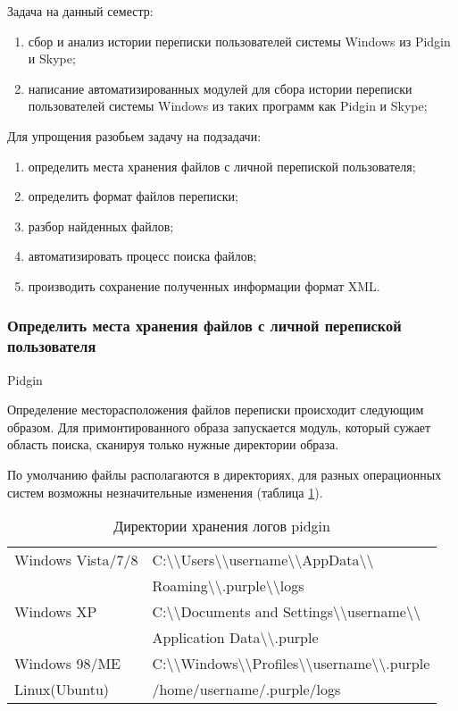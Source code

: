 Задача на данный семестр:  

\begin{enumerate}
\item сбор и анализ истории переписки пользователей системы Windows из Pidgin и Skype;
\item написание автоматизированных модулей для сбора истории переписки пользователей системы Windows из таких программ как Pidgin и Skype;
\end{enumerate}

Для упрощения разобьем задачу на подзадачи:
\begin{enumerate}
\item определить места хранения файлов с личной перепиской пользователя;
\item определить формат файлов переписки;
\item разбор найденных файлов;
\item автоматизировать процесс поиска файлов;
\item производить сохранение полученных информации формат XML.
\end{enumerate}

\subsubsection{Определить места хранения файлов с личной перепиской пользователя}

Pidgin

Определение месторасположения файлов переписки происходит следующим образом. Для примонтированного образа запускается модуль, который сужает область поиска, сканируя только нужные директории образа. 

По умолчанию файлы располагаются в директориях, для разных операционных систем возможны незначительные изменения (таблица \ref{tab:pidgin}). 

\begin{table}[h!]
\caption{Директории хранения логов pidgin}
\label{tab:pidgin}
\begin{tabularx}{\linewidth}{|l|X|}
\hline
Windows Vista/7/8 & C:\textbackslash\textbackslash  Users\textbackslash\textbackslash  username\textbackslash\textbackslash  AppData\textbackslash\textbackslash \tabularnewline &  Roaming\textbackslash\textbackslash .purple\textbackslash\textbackslash  logs \tabularnewline 
\hline 
Windows XP & C:\textbackslash\textbackslash  Documents and Settings\textbackslash\textbackslash  username\textbackslash\textbackslash \tabularnewline & Application Data\textbackslash\textbackslash .purple\tabularnewline
\hline 
Windows 98/ME 	& C:\textbackslash\textbackslash Windows\textbackslash\textbackslash Profiles\textbackslash\textbackslash username\textbackslash\textbackslash.purple \tabularnewline
\hline 
Linux(Ubuntu) &	/home/username/.purple/logs \tabularnewline 
\hline
\end{tabularx}
\end{table}


